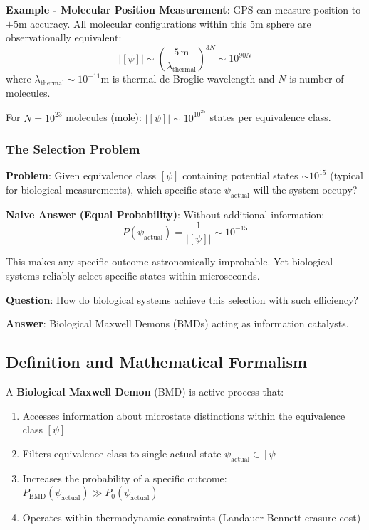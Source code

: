 \documentclass[11pt,onecolumn]{article}
\begin{document}
\textbf{Example - Molecular Position Measurement}: GPS can measure position to $\pm 5$m accuracy. All molecular configurations within this 5m sphere are observationally equivalent:
\begin{equation}
|[\psi]| \sim \left(\frac{5\,\text{m}}{\lambda_{\text{thermal}}}\right)^{3N} \sim 10^{90N}
\end{equation}
where $\lambda_{\text{thermal}} \sim 10^{-11}$m is thermal de Broglie wavelength and $N$ is number of molecules.

For $N = 10^{23}$ molecules (mole): $|[\psi]| \sim 10^{10^{25}}$ states per equivalence class.

\subsubsection{The Selection Problem}

\textbf{Problem}: Given equivalence class $[\psi]$ containing potential states $\sim 10^{15}$ (typical for biological measurements), which specific state $\psi_{\text{actual}}$ will the system occupy?

\textbf{Naive Answer (Equal Probability)}: Without additional information:
\begin{equation}
P(\psi_{\text{actual}}) = \frac{1}{|[\psi]|} \sim 10^{-15}
\end{equation}

This makes any specific outcome astronomically improbable. Yet biological systems reliably select specific states within microseconds.

\textbf{Question}: How do biological systems achieve this selection with such efficiency?

\textbf{Answer}: Biological Maxwell Demons (BMDs) acting as information catalysts.

\subsection{Definition and Mathematical Formalism}

\begin{definition}
\label{def:bmd}
A \textbf{Biological Maxwell Demon} (BMD) is active process that:
\begin{enumerate}
\item Accesses information about microstate distinctions within the equivalence class $[\psi]$
\item Filters equivalence class to single actual state $\psi_{\text{actual}} \in [\psi]$  
\item Increases the probability of a specific outcome: $P_{\text{BMD}}(\psi_{\text{actual}}) \gg P_0(\psi_{\text{actual}})$
\item Operates within thermodynamic constraints (Landauer-Bennett erasure cost)
\end{enumerate}
\end{definition}
\end{document}
